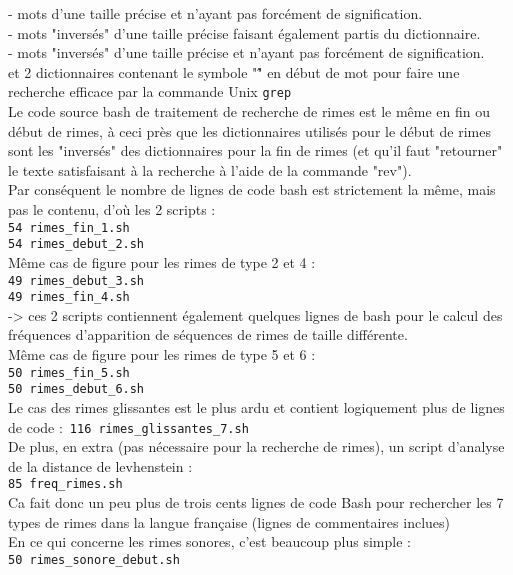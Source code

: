 \documentclass[french]{article}
\begin{document}
\begin{appendix}
- mots d'une taille précise et n'ayant pas forcément de signification.\\
- mots "inversés" d'une taille précise faisant également partis du dictionnaire.\\
- mots "inversés" d'une taille précise et n'ayant pas forcément de signification.\\
et 2 dictionnaires contenant le symbole "\^" en début de mot pour faire une recherche efficace par la commande Unix \texttt{grep}\\
Le code source bash de traitement de recherche de rimes est le même en fin ou début de rimes, à ceci près que les dictionnaires utilisés pour le début de rimes sont les "inversés" des dictionnaires pour la fin de rimes (et qu'il faut "retourner" le texte satisfaisant à la recherche à l'aide de la commande "rev").\\
Par conséquent le nombre de lignes de code bash est strictement la même, mais pas le contenu, d'où les 2 scripts :\\
\texttt{54 rimes\_fin\_1.sh}\\
\texttt{54 rimes\_debut\_2.sh}\\
Même cas de figure pour les rimes de type 2 et 4 :\\
\texttt{49 rimes\_debut\_3.sh}\\
\texttt{49 rimes\_fin\_4.sh}\\
-> ces 2 scripts contiennent également quelques lignes de bash pour le calcul des fréquences d'apparition de séquences de rimes de taille différente.\\
Même cas de figure pour les rimes de type 5 et 6 :\\
\texttt{50 rimes\_fin\_5.sh}\\
\texttt{50 rimes\_debut\_6.sh}\\
Le cas des rimes glissantes est le plus ardu et contient logiquement plus de lignes de code :\
\texttt{116 rimes\_glissantes\_7.sh}\\
De plus, en extra (pas nécessaire pour la recherche de rimes), un script d'analyse de la distance de levhenstein :\\
\texttt{85 freq\_rimes.sh}\\
Ca fait donc un peu plus de trois cents lignes de code Bash pour rechercher les 7 types de rimes dans la langue française (lignes de commentaires inclues)\\
\newpage
En ce qui concerne les rimes sonores, c'est beaucoup plus simple :\\
\texttt{50 rimes\_sonore\_debut.sh}\\

\end{appendix}
\end{document}
